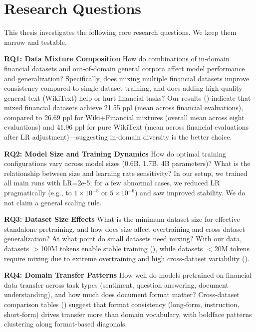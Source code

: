 \section{Research Questions}

This thesis investigates the following core research questions. We keep them narrow and testable.

\textbf{RQ1: Data Mixture Composition}
How do combinations of in‑domain financial datasets and out‑of‑domain general corpora affect model performance and generalization? Specifically, does mixing multiple financial datasets improve consistency compared to single‑dataset training, and does adding high‑quality general text (WikiText) help or hurt financial tasks? Our results () indicate that mixed financial datasets achieve 21.55 ppl (mean across financial evaluations), compared to 26.69 ppl for Wiki+Financial mixtures (overall mean across eight evaluations) and 41.96 ppl for pure WikiText (mean across financial evaluations after LR adjustment)—suggesting in‑domain diversity is the better choice.

\textbf{RQ2: Model Size and Training Dynamics}
How do optimal training configurations vary across model sizes (0.6B, 1.7B, 4B parameters)? What is the relationship between size and learning rate sensitivity? In our setup, we trained all main runs with LR=2e‑5; for a few abnormal cases, we reduced LR pragmatically (e.g., to $1\times10^{-5}$ or $5\times10^{-6}$) and saw improved stability. We do not claim a general scaling rule.

\textbf{RQ3: Dataset Size Effects}
What is the minimum dataset size for effective standalone pretraining, and how does size affect overtraining and cross‑dataset generalization? At what point do small datasets need mixing? With our data, datasets $>$100M tokens enable stable training (), while datasets $<$20M tokens require mixing due to extreme overtraining and high cross‑dataset variability ().

\textbf{RQ4: Domain Transfer Patterns}
How well do models pretrained on financial data transfer across task types (sentiment, question answering, document understanding), and how much does document format matter? Cross‑dataset comparison tables () suggest that format consistency (long‑form, instruction, short‑form) drives transfer more than domain vocabulary, with boldface patterns clustering along format‑based diagonals.

